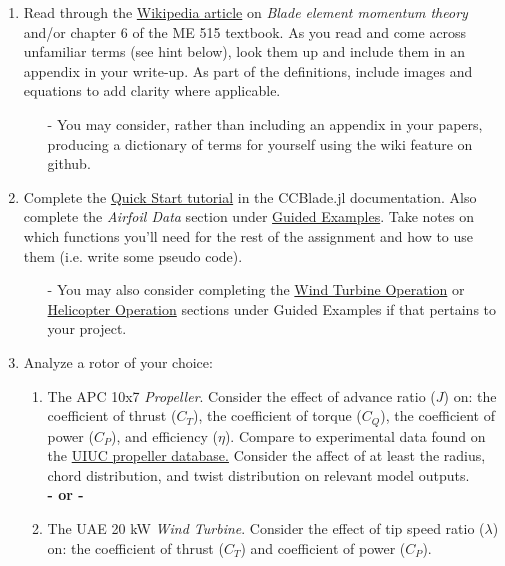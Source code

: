 \documentclass[12pt]{article}
\begin{document}
\begin{enumerate}
	\item Read  through the \href{https://en.wikipedia.org/wiki/Blade_element_momentum_theory}{Wikipedia article} on \textit{Blade element momentum theory} and/or chapter 6 of the ME 515 textbook. As you read and come across unfamiliar terms (see hint below), look them up and include them in an appendix in your write-up.  As part of the definitions, include images and equations to add clarity where applicable.
	\begin{itemize}
		\item[-] You may consider, rather than including an appendix in your papers, producing a dictionary of terms for yourself using the wiki feature on github.
	\end{itemize}
	\item Complete the \href{https://flow.byu.edu/CCBlade.jl/stable/tutorial/}{Quick Start tutorial} in the CCBlade.jl documentation. 
	Also complete the \textit{Airfoil Data} section under \href{https://flow.byu.edu/CCBlade.jl/stable/howto/#Airfoil-Data}{Guided Examples}. 
	Take notes on which functions you'll need for the rest of the assignment and how to use them (i.e. write some pseudo code).
	\begin{itemize}
		\item[-] You may also consider completing the \href{https://flow.byu.edu/CCBlade.jl/stable/howto/#Wind-Turbine-Operation}{Wind Turbine Operation} or \href{https://flow.byu.edu/CCBlade.jl/stable/howto/#Helicopter-Operation}{Helicopter Operation} sections under Guided Examples if that pertains to your project. 
	\end{itemize} 
	\item Analyze a rotor of your choice:
	\begin{enumerate}
		\item The APC 10x7 \textit{Propeller}. Consider the effect of advance ratio ($J$) on: the coefficient of thrust ($C_T$), the coefficient of torque ($C_Q$), the coefficient of power ($C_P$), and efficiency ($\eta$).  Compare to experimental data found on the \href{https://m-selig.ae.illinois.edu/props/propDB.html}{UIUC propeller database.} Consider the affect of at least the radius, chord distribution, and twist distribution on relevant model outputs. \\
		\textbf{- or -}
		\item The UAE 20 kW \textit{Wind Turbine}. Consider the effect of tip speed ratio ($\lambda$) on: the coefficient of thrust ($C_T$) and coefficient of power ($C_P$).

\end{enumerate}
\end{enumerate}
\end{document}
